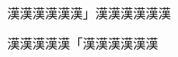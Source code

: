 \documentclass[pdflatex]{jlreq}
\begin{document}
\hsize=65pt \parindent=0pt
漢漢漢漢漢漢」漢漢漢漢漢漢

漢漢漢漢漢「漢漢漢漢漢漢

\par
\end{document}
